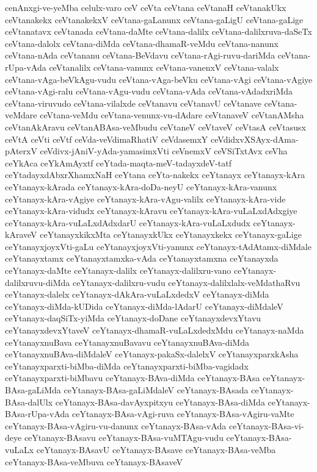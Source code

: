 {cenAnxgi-ve-yeMba
celulx-varo
ceV
ceVta
ceVtana
ceVtanaH
ceVtanakUkx
ceVtanakekx
ceVtanakekxV
ceVtana-gaLanunx
ceVtana-gaLigU
ceVtana-gaLige
ceVtanatavx
ceVtanada
ceVtana-daMte
ceVtana-dalilx
ceVtana-dalilxruva-daSeTx
ceVtana-dalolx
ceVtana-diMda
ceVtana-dhamaR-veMdu
ceVtana-nanunx
ceVtana-nAda
ceVtananu
ceVtana-BeVdavu
ceVtana-rAgi-ruvu-dariMda
ceVtana-rUpa-vAda
ceVtanalilx
ceVtana-vanunx
ceVtana-vanenxV
ceVtana-valalx
ceVtana-vAga-beVkAgu-vudu
ceVtana-vAga-beVku
ceVtana-vAgi
ceVtana-vAgiye
ceVtana-vAgi-ralu
ceVtana-vAgu-vudu
ceVtana-vAda
ceVtana-vAdadxriMda
ceVtana-viruvudo
ceVtana-vilalxde
ceVtanavu
ceVtanavU
ceVtanave
ceVtana-veMdare
ceVtana-veMdu
ceVtana-venunx-vu-dAdare
ceVtanaveV
ceVtanAMsha
ceVtanAkAravu
ceVtanABAsa-veMbudu
ceVtaneV
ceVtaveV
ceVtasA
ceVtasusx
ceVtA
ceVti
ceVtf
ceVda-veVdimaRhatiV
ceVdasemxY
ceVdidxvXSAyx-dAma-pAterxV
ceVdivx-jAniV-yAda-yamasimxVti
ceVnemxV
ceVSiTxtAvx
ceVha
ceYkAca
ceYkAmAyxtf
ceYtada-maqta-meV-tadayxdeV-tatf
ceYtadayxdAbxrXhamxNaH
ceYtana
ceYta-nakekx
ceYtanayx
ceYtanayx-kAra
ceYtanayx-kArada
ceYtanayx-kAra-doDa-neyU
ceYtanayx-kAra-vanunx
ceYtanayx-kAra-vAgiye
ceYtanayx-kAra-vAgu-valilx
ceYtanayx-kAra-vide
ceYtanayx-kAra-vidudx
ceYtanayx-kAravu
ceYtanayx-kAra-vuLaLxdAdxgiye
ceYtanayx-kAra-vuLaLxdAdxdarU
ceYtanayx-kAra-vuLaLxdudx
ceYtanayx-kAraveV
ceYtanayxkikxMta
ceYtanayxkUkx
ceYtanayxkekx
ceYtanayx-gaLige
ceYtanayxjoyxVti-gaLu
ceYtanayxjoyxVti-yanunx
ceYtanayx-tAdAtamx-diMdale
ceYtanayxtamx
ceYtanayxtamxka-vAda
ceYtanayxtamxna
ceYtanayxda
ceYtanayx-daMte
ceYtanayx-dalilx
ceYtanayx-dalilxru-vano
ceYtanayx-dalilxruvu-diMda
ceYtanayx-dalilxru-vudu
ceYtanayx-dalilxlalx-veMdathaRvu
ceYtanayx-dalelx
ceYtanayx-dAkAra-vuLaLxdedxV
ceYtanayx-diMda
ceYtanayx-diMda-kUDida
ceYtanayx-diMda-lAdarU
ceYtanayx-diMdaleV
ceYtanayx-daqSiTx-yiMda
ceYtanayx-doDane
ceYtanayxdevxYtavu
ceYtanayxdevxYtaveV
ceYtanayx-dhamaR-vuLaLxdedxMdu
ceYtanayx-naMda
ceYtanayxnuBava
ceYtanayxnuBavavu
ceYtanayxnuBAva-diMda
ceYtanayxnuBAva-diMdaleV
ceYtanayx-pakaSx-dalelxV
ceYtanayxparxkAsha
ceYtanayxparxti-biMba-diMda
ceYtanayxparxti-biMba-vagidadx
ceYtanayxparxti-biMbavu
ceYtanayx-BAva-diMda
ceYtanayx-BAsa
ceYtanayx-BAsa-gaLiMda
ceYtanayx-BAsa-gaLiMdaleV
ceYtanayx-BAsada
ceYtanayx-BAsa-dalUlx
ceYtanayx-BAsa-davAyxpitxyu
ceYtanayx-BAsa-diMda
ceYtanayx-BAsa-rUpa-vAda
ceYtanayx-BAsa-vAgi-ruva
ceYtanayx-BAsa-vAgiru-vaMte
ceYtanayx-BAsa-vAgiru-vu-danunx
ceYtanayx-BAsa-vAda
ceYtanayx-BAsa-vi-deye
ceYtanayx-BAsavu
ceYtanayx-BAsa-vuMTAgu-vudu
ceYtanayx-BAsa-vuLaLx
ceYtanayx-BAsavU
ceYtanayx-BAsave
ceYtanayx-BAsa-veMba
ceYtanayx-BAsa-veMbuva
ceYtanayx-BAsaveV
}

